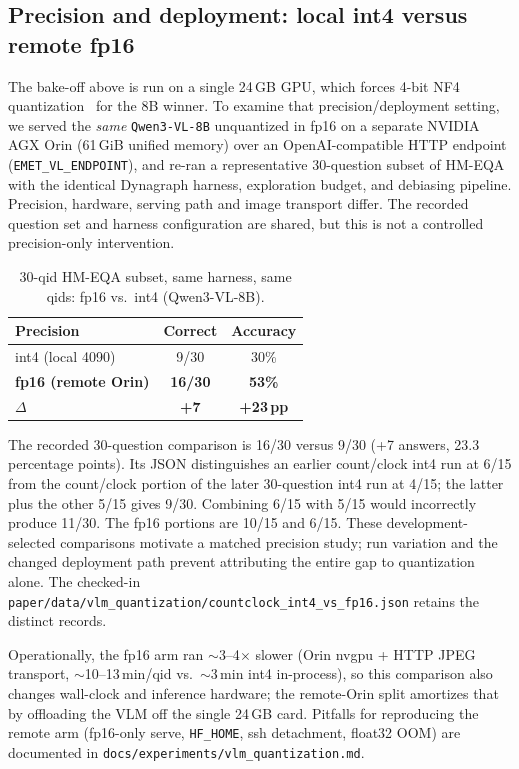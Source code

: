 \subsection{Precision and deployment: local int4 versus remote fp16}
\label{app:model_choice_quantization}

The bake-off above is run on a single 24\,GB GPU, which forces 4-bit NF4
quantization~\citep{dettmers2023qlora} for the 8B winner. To examine that
precision/deployment setting, we served the \emph{same} \texttt{Qwen3-VL-8B} unquantized in fp16 on a
separate NVIDIA AGX Orin (61\,GiB unified memory) over an OpenAI-compatible HTTP
endpoint (\texttt{EMET\_VL\_ENDPOINT}), and re-ran a representative 30-question subset of
HM-EQA with the identical Dynagraph harness, exploration budget, and debiasing pipeline.
Precision, hardware, serving path and image transport differ. The recorded
question set and harness configuration are shared, but this is not a controlled
precision-only intervention.

\begin{table}[h]
  \centering
  \caption{30-qid HM-EQA subset, same harness, same qids: fp16 vs.\ int4 (Qwen3-VL-8B).}
  \label{tab:vlm_precision}
  \small
  \begin{tabular}{@{}lcc@{}}
    \toprule
    Precision & Correct & Accuracy \\
    \midrule
    int4 (local 4090) & 9/30 & 30\% \\
    \textbf{fp16 (remote Orin)} & \textbf{16/30} & \textbf{53\%} \\
    \midrule
    $\Delta$ & \textbf{+7} & \textbf{+23\,pp} \\
    \bottomrule
  \end{tabular}
\end{table}

The recorded 30-question comparison is 16/30 versus 9/30 (+7 answers,
23.3 percentage points). Its JSON distinguishes an earlier count/clock int4
run at 6/15 from the count/clock portion of the later 30-question int4 run at
4/15; the latter plus the other 5/15 gives 9/30. Combining 6/15 with 5/15
would incorrectly produce 11/30. The fp16 portions are 10/15 and 6/15.
These development-selected comparisons motivate a matched precision study;
run variation and the changed deployment path prevent attributing the entire
gap to quantization alone. The checked-in
\texttt{paper/data/vlm\_quantization/countclock\_int4\_vs\_fp16.json}
retains the distinct records.

Operationally, the fp16 arm ran $\sim$3--4$\times$ slower (Orin nvgpu + HTTP JPEG
transport, $\sim$10--13\,min/qid vs.\ $\sim$3\,min int4 in-process), so this comparison also changes
wall-clock and inference hardware; the remote-Orin split amortizes that by
offloading the VLM off the single 24\,GB card. Pitfalls for reproducing the remote arm
(fp16-only serve, \texttt{HF\_HOME}, ssh detachment, float32 OOM) are documented in
\texttt{docs/experiments/vlm\_quantization.md}.

